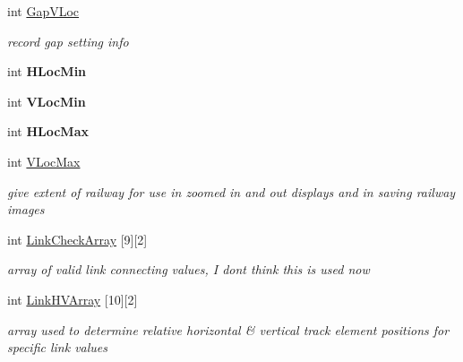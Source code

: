 \begin{DoxyCompactItemize}
\mbox{\label{class_t_track_abb7e520a67eccc292c97444ff395d0c0}} 
int \mbox{\hyperlink{class_t_track_abb7e520a67eccc292c97444ff395d0c0}{Gap\+V\+Loc}}
\begin{DoxyCompactList}\small\item\em record gap setting info \end{DoxyCompactList}\item 
\mbox{\label{class_t_track_aa3a4180a4a3316a5d265964a6ba6b9f8}} 
int {\bfseries H\+Loc\+Min}
\item 
\mbox{\label{class_t_track_a906deb75070b0e29cf624569c982c23a}} 
int {\bfseries V\+Loc\+Min}
\item 
\mbox{\label{class_t_track_ab464ea55d7bf8c25d8d5863295209937}} 
int {\bfseries H\+Loc\+Max}
\item 
\mbox{\label{class_t_track_a847326710b5b428b1a8bb54b1d143c26}} 
int \mbox{\hyperlink{class_t_track_a847326710b5b428b1a8bb54b1d143c26}{V\+Loc\+Max}}
\begin{DoxyCompactList}\small\item\em give extent of railway for use in zoomed in and out displays and in saving railway images \end{DoxyCompactList}\item 
\mbox{\label{class_t_track_ae8df4625e0c05c1158f3fc366afe928c}} 
int \mbox{\hyperlink{class_t_track_ae8df4625e0c05c1158f3fc366afe928c}{Link\+Check\+Array}} \mbox{[}9\mbox{]}\mbox{[}2\mbox{]}
\begin{DoxyCompactList}\small\item\em array of valid link connecting values, I don\textquotesingle{}t think this is used now \end{DoxyCompactList}\item 
\mbox{\label{class_t_track_ab6f605b1cf52a3f8efba5549e19368a8}} 
int \mbox{\hyperlink{class_t_track_ab6f605b1cf52a3f8efba5549e19368a8}{Link\+H\+V\+Array}} \mbox{[}10\mbox{]}\mbox{[}2\mbox{]}
\begin{DoxyCompactList}\small\item\em array used to determine relative horizontal \& vertical track element positions for specific link values \end{DoxyCompactList}\item 

\end{DoxyCompactItemize}
